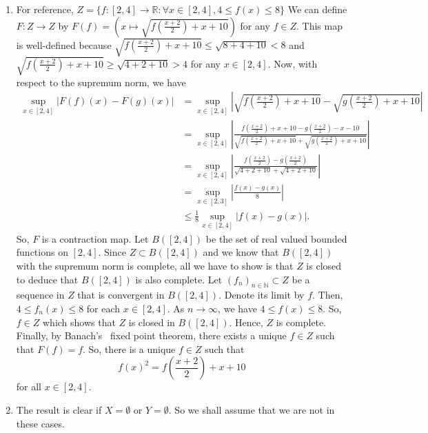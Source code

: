 \documentclass{article}
\newcommand{\R}{\mathbb{R}}
\newcommand{\N}{\mathbb{N}}
\begin{document}
\begin{enumerate}[label=\alph*)]

\item For reference, $Z= \{f:[2,4]\to\R: \forall x \in [2,4], 4\leq f(x) \leq 8\}$
We can define $F: Z \to Z$ by $F(f) = \left( x \mapsto \sqrt{f\left( \frac{x+2}{2} \right) + x+10} 
\right)$ for any $f\in Z$. This map is well-defined because $\sqrt{f\left( \frac{x+2}{2} \right) + 
x+10} \leq \sqrt{8+4+10}<8$ and $\sqrt{f\left( \frac{x+2}{2} \right) + x+10} \geq \sqrt{4+2+10}>4$ for 
any $x\in[2,4]$. Now, with respect to the supremum norm, we have 
\begin{align*}
    \sup_{x\in[2,4]} |F(f)(x) - F(g)(x)|
    &= \sup_{x\in[2,4]} \left| \sqrt{f\left( \frac{x+2}{2} \right) + x + 10 } 
    - \sqrt{ g\left( \frac{x+2}{2} \right) + x + 10 } \right|\\ 
    &= \sup_{x\in[2,4]} \left| \frac{ f\left( \frac{x+2}{2} \right) + x + 10
    - g\left( \frac{x+2}{2} \right) - x - 10 }
    {\sqrt{f\left( \frac{x+2}{2} \right) + x + 10 } 
    + \sqrt{ g\left( \frac{x+2}{2} \right) + x + 10 }} \right|\\ 
    &= \sup_{x\in[2,4]} \left| \frac{ f\left( \frac{x+2}{2} \right) - g\left( \frac{x+2}{2} \right)}
    {\sqrt{4 + 2 + 10 } + \sqrt{ 4 + 2 + 10 }} \right|\\ 
    &= \sup_{x\in[2,3]} \left| \frac{ f\left( x \right) - g\left( x \right)}
    {8} \right|\\ 
    &\leq \frac{1}{8} \sup_{x\in[2,4]} \left| f\left( x \right) - g\left( x \right) \right|. 
\end{align*} 
So, $F$ is a contraction map. Let $B([2,4])$ be the set of real valued bounded functions on $[2,4]$. 
Since $Z \subset B([2,4]) $ and we know that $B([2,4])$ with the supremum norm is complete, all 
we have to show is that $Z$ is closed to deduce that $B([2,4])$ is also complete. Let $(f_n)_{n\in\N} 
\subset Z$ be a sequence in $Z$ that is convergent in $B([2,4])$. Denote its limit by $f$. Then, 
$4\leq f_n(x) \leq 8$ for each $x\in[2,4]$. As $n\to \infty$, we have $4\leq f(x) \leq 8$. So, 
$f\in Z$ which shows that $Z$ is closed in $B([2,4])$. Hence, $Z$ is complete. Finally, by Banach's \
fixed point theorem, there exists a unique $f\in Z$ such that $F(f) =  f$. So, there is a unique 
$f\in Z$ such that 
$$
f(x)^2 = f\left( \frac{x+2}{2} \right) + x + 10 
$$ for all $x\in[2,4]$. 

\item The result is clear if $X=\emptyset$ or $Y=\emptyset$. So we shall assume that we are not in 
these cases.


\end{enumerate}
\end{document}
